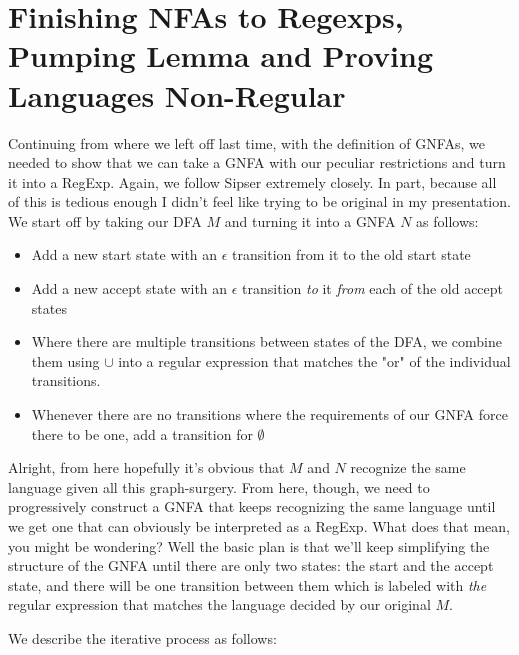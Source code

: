\documentclass[11pt]{article}
\begin{document}
\section{Finishing NFAs to Regexps, Pumping Lemma and Proving Languages Non-Regular}
\label{sec-5}
Continuing from where we left off last time, with the definition of GNFAs, we needed to show that we can take a GNFA with our peculiar restrictions and turn it into a RegExp. Again, we follow Sipser extremely closely. In part, because all of this is tedious enough I didn't feel like trying to be original in my presentation. We start off by taking our DFA $M$ and turning it into a GNFA $N$ as follows: 

\begin{itemize}
\item Add a new start state with an $\epsilon$ transition from it to the old start state
\item Add a new accept state with an $\epsilon$ transition \emph{to} it \emph{from} each of the old accept states
\item Where there are multiple transitions between states of the DFA, we combine them using $\cup$ into a regular expression that matches the "or" of the individual transitions.
\item Whenever there are no transitions where the requirements of our GNFA force there to be one, add a transition for $\emptyset$
\end{itemize}

Alright, from here hopefully it's obvious that $M$ and $N$ recognize the same language given all this graph-surgery. From here, though, we need to progressively construct a GNFA that keeps recognizing the same language until we get one that can obviously be interpreted as a RegExp. What does that mean, you might be wondering? Well the basic plan is that we'll keep simplifying the structure of the GNFA until there are only two states: the start and the accept state, and there will be one transition between them which is labeled with \emph{the} regular expression that matches the language decided by our original $M$.

We describe the iterative process as follows: 
\end{document}
